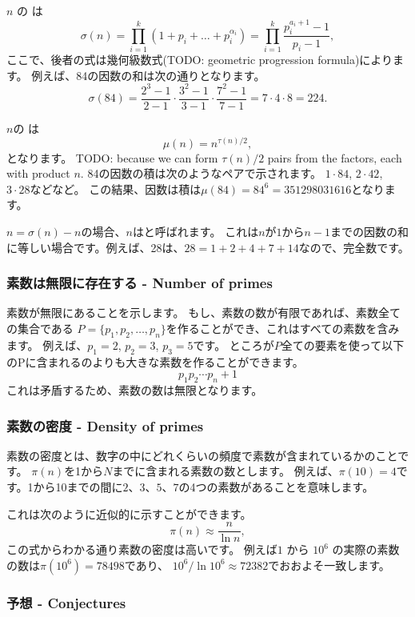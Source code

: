 $n$ の  は
\[\sigma(n)=\prod_{i=1}^k (1+p_i+\ldots+p_i^{\alpha_i}) = \prod_{i=1}^k \frac{p_i^{a_i+1}-1}{p_i-1},\]
ここで、後者の式は幾何級数式(TODO: geometric progression formula)によります。
例えば、84の因数の和は次の通りとなります。
\[\sigma(84)=\frac{2^3-1}{2-1} \cdot \frac{3^2-1}{3-1} \cdot \frac{7^2-1}{7-1} = 7 \cdot 4 \cdot 8 = 224.\]

$n$の  は
\[\mu(n)=n^{\tau(n)/2},\]
となります。
TODO:  because we can form $\tau(n)/2$ pairs from the factors,
each with product $n$.
84の因数の積は次のようなペアで示されます。
$1 \cdot 84$, $2 \cdot 42$, $3 \cdot 28$などなど。
この結果、因数は積は$\mu(84)=84^6=351298031616$となります。

$n=\sigma(n)-n$の場合、$n$はと呼ばれます。
これは$n$が$1$から$n - 1$までの因数の和に等しい場合です。例えば、28は、$28=1+2+4+7+14$なので、完全数です。

\subsubsection{素数は無限に存在する - Number of primes}

素数が無限にあることを示します。
もし、素数の数が有限であれば、素数全ての集合である
$P=\{p_1,p_2,\ldots,p_n\}$を作ることができ、これはすべての素数を含みます。
例えば、$p_1=2$, $p_2=3$, $p_3=5$です。
ところが$P$全ての要素を使って以下のPに含まれるのよりも大きな素数を作ることができます。
\[p_1 p_2 \cdots p_n+1\]
これは矛盾するため、素数の数は無限となります。

\subsubsection{素数の密度 - Density of primes}

素数の密度とは、数字の中にどれくらいの頻度で素数が含まれているかのことです。
$\pi(n)$を1から$N$までに含まれる素数の数とします。
例えば、$\pi(10)=4$です。1から10までの間に$2、3、5、7$の4つの素数があることを意味します。

これは次のように近似的に示すことができます。
\[\pi(n) \approx \frac{n}{\ln n},\]
この式からわかる通り素数の密度は高いです。
例えば$1$ から $10^6$ の実際の素数の数は$\pi(10^6)=78498$であり、
$10^6 / \ln 10^6 \approx 72382$でおおよそ一致します。

\subsubsection{予想 - Conjectures}

